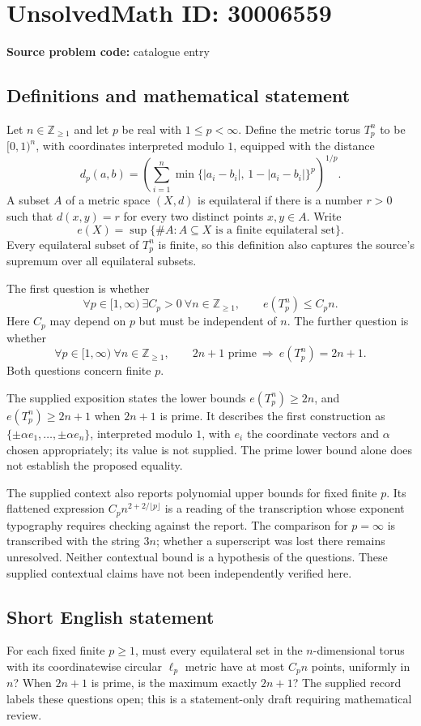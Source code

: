 \documentclass[11pt]{article}
\newcommand{\Z}{\mathbb{Z}}
\begin{document}
\section*{UnsolvedMath ID: 30006559}
\textbf{Source problem code:} catalogue entry
\subsection{Definitions and mathematical statement}
Let \(n\in\Z_{\geq1}\) and let \(p\) be real with \(1\leq p<\infty\). Define the metric torus \(T_p^n\) to be \([0,1)^n\), with coordinates interpreted modulo \(1\), equipped with the distance
\[
 d_p(a,b)=\left(\sum_{i=1}^{n}\min\{|a_i-b_i|,\,1-|a_i-b_i|\}^{p}\right)^{1/p}.
\]
A subset \(A\) of a metric space \((X,d)\) is equilateral if there is a number \(r>0\) such that \(d(x,y)=r\) for every two distinct points \(x,y\in A\). Write
\[
 e(X)=\sup\{\#A:A\subseteq X\text{ is a finite equilateral set}\}.
\]
Every equilateral subset of \(T_p^n\) is finite, so this definition also captures the source's supremum over all equilateral subsets.

The first question is whether
\[
 \forall p\in[1,\infty)\ \exists C_p>0\ \forall n\in\Z_{\geq1},\qquad e(T_p^n)\leq C_p n.
\]
Here \(C_p\) may depend on \(p\) but must be independent of \(n\). The further question is whether
\[
 \forall p\in[1,\infty)\ \forall n\in\Z_{\geq1},\qquad
 2n+1\text{ prime}\ \Longrightarrow\ e(T_p^n)=2n+1.
\]
Both questions concern finite \(p\).

The supplied exposition states the lower bounds \(e(T_p^n)\geq2n\), and \(e(T_p^n)\geq2n+1\) when \(2n+1\) is prime. It describes the first construction as \(\{\pm\alpha e_1,\ldots,\pm\alpha e_n\}\), interpreted modulo \(1\), with \(e_i\) the coordinate vectors and \(\alpha\) chosen appropriately; its value is not supplied. The prime lower bound alone does not establish the proposed equality.

The supplied context also reports polynomial upper bounds for fixed finite \(p\). Its flattened expression \(C_p n^{2+2/\lfloor p\rfloor}\) is a reading of the transcription whose exponent typography requires checking against the report. The comparison for \(p=\infty\) is transcribed with the string \(3n\); whether a superscript was lost there remains unresolved. Neither contextual bound is a hypothesis of the questions. These supplied contextual claims have not been independently verified here.
\subsection{Short English statement}
For each fixed finite \(p\geq1\), must every equilateral set in the \(n\)-dimensional torus with its coordinatewise circular \(\ell_p\) metric have at most \(C_p n\) points, uniformly in \(n\)? When \(2n+1\) is prime, is the maximum exactly \(2n+1\)? The supplied record labels these questions open; this is a statement-only draft requiring mathematical review.
\end{document}
